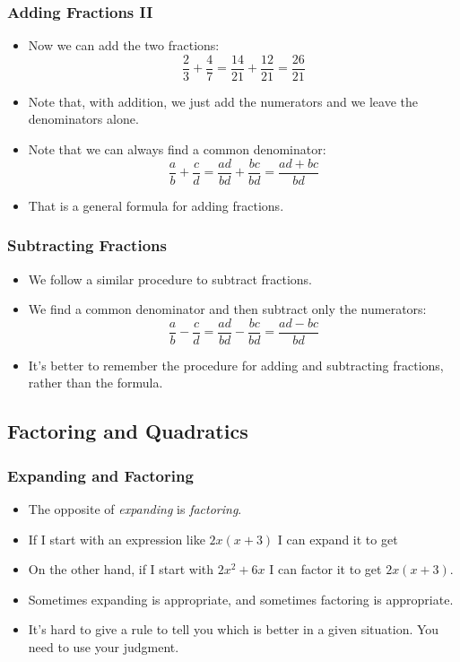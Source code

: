 \documentclass[serif,ignorenonframetext]{beamer}
\begin{document}
\begin{frame}
  \frametitle{Adding Fractions II}
  \begin{itemize}[<+->]
  \item Now we can add the two fractions:
    \begin{equation*}
      \frac{2}{3} + \frac{4}{7}
      = \frac{14}{21} + \frac{12}{21} 
      = \frac{26}{21}
    \end{equation*}
  \item Note that, with addition, we just add the numerators and we
    leave the denominators alone.
  \item Note that we can always find a common denominator:
    \begin{equation*}
      \frac{a}{b} + \frac{c}{d} 
      = \frac{ad}{bd} + \frac{bc}{bd}
      = \frac{ad+bc}{bd}
    \end{equation*}
  \item That is a general formula for adding fractions.
  \end{itemize}
\end{frame}

\begin{frame}
  \frametitle{Subtracting Fractions}
  \begin{itemize}[<+->]
  \item We follow a similar procedure to subtract fractions.
  \item We find a common denominator and then subtract only the
    numerators: 
    \begin{equation*}
      \frac{a}{b} - \frac{c}{d} = \frac{ad}{bd} - \frac{bc}{bd} =
      \frac{ad-bc}{bd} 
    \end{equation*}
  \item It's better to remember the procedure for adding and
    subtracting fractions, rather than the formula.
  \end{itemize}
\end{frame}

\subsection{Factoring and Quadratics}

\begin{frame}
  \frametitle{Expanding and Factoring}
  \begin{itemize}[<+->]
  \item The opposite of \textit{expanding} is \textit{factoring}.
  \item If I start with an expression like $2x(x+3)$ I can expand it
    to get 
  \item<4-> On the other hand, if I start with $2x^2+6x$ I can factor
    it to get $2x(x+3)$.
  \item Sometimes expanding is appropriate, and sometimes factoring is
    appropriate.
  \item It's hard to give a rule to tell you which is better in a
    given situation.  You need to use your judgment.
  \end{itemize}
\end{frame}
\end{document}
